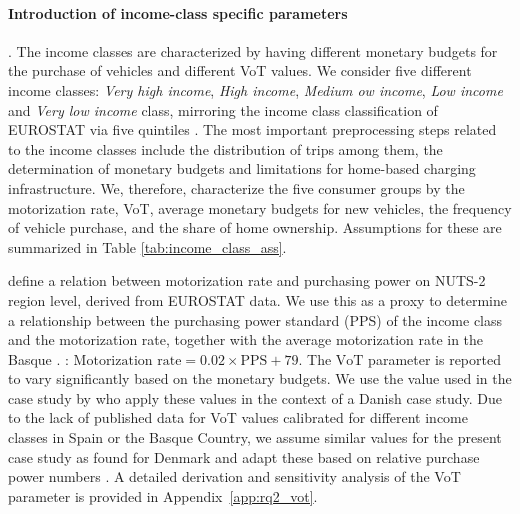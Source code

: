         \paragraph*{Introduction of income-class specific parameters}
            
            . The income classes are characterized by having different monetary budgets for the purchase of vehicles and different VoT values. We consider five different income classes: \textit{Very high income}, \textit{High income}, \textit{Medium ow income}, \textit{Low income} and \textit{Very low income} class, mirroring the income class classification of EUROSTAT via five quintiles \citep{eurostat_icw_metadata}. The most important pre\deleted{-}processing steps related to the income classes include the distribution of trips among them, the determination of monetary budgets and limitations for home-based charging infrastructure. 
            We, therefore, characterize the five consumer groups by the motorization rate, VoT, average monetary budgets for new vehicles, the frequency of vehicle purchase, and the share of home ownership. Assumptions for these are summarized in Table \ref{tab:income_class_ass}.
            
            
            \citet{Mattioli2023} define a relation between motorization rate and purchasing power on NUTS-2 region level, derived from EUROSTAT data. 
            We use this as a proxy to determine a relationship between the purchasing power standard (PPS) of the income class and the motorization rate, together with the average motorization rate in the Basque . : $\textrm{Motorization rate} = 0.02 \times \textrm{PPS} + 79$.  The $\mathrm{VoT}$ parameter is reported to vary significantly based on the monetary budgets. We use the value used in the case study by \citet{TATTINI2018265} who apply these values in the context of a Danish case study. Due to the lack of published data for VoT values calibrated for different income classes in Spain or the Basque Country, we assume similar values for the present case study as found for Denmark and adapt these based on relative purchase power numbers \citep{Eurostat_ilc_di02_2025}. A detailed derivation and sensitivity analysis of the VoT parameter is provided in Appendix~\ref{app:rq2_vot}.
            
